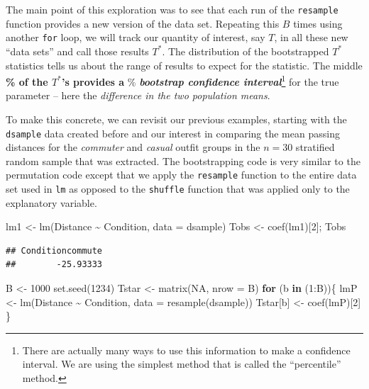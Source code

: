 \documentclass[
]{book}
\newenvironment{Shaded}{\begin{snugshade}}{\end{snugshade}}
\newcommand{\AttributeTok}[1]{\textcolor[rgb]{0.77,0.63,0.00}{#1}}
\newcommand{\ConstantTok}[1]{\textcolor[rgb]{0.00,0.00,0.00}{#1}}
\newcommand{\ControlFlowTok}[1]{\textcolor[rgb]{0.13,0.29,0.53}{\textbf{#1}}}
\newcommand{\DecValTok}[1]{\textcolor[rgb]{0.00,0.00,0.81}{#1}}
\newcommand{\FunctionTok}[1]{\textcolor[rgb]{0.00,0.00,0.00}{#1}}
\newcommand{\NormalTok}[1]{#1}
\newcommand{\OtherTok}[1]{\textcolor[rgb]{0.56,0.35,0.01}{#1}}
\newcommand{\SpecialCharTok}[1]{\textcolor[rgb]{0.00,0.00,0.00}{#1}}
\begin{document}
\indent The main point of this exploration was to see that each run of the
\texttt{resample} function provides a new version of the data set. Repeating this
\(B\) times using
another \texttt{for} loop, we will track our quantity of interest, say \(T\), in all
these new ``data sets'' and call those results \(T^*\). The distribution of the
bootstrapped
\(T^*\) statistics tells us about the range of results to expect
for the statistic. The middle \textbf{\% of the \(T^*\)'s provides a }\%
\textbf{\emph{bootstrap confidence interval}}\footnote{There are actually many ways to use this
  information to make a confidence interval. We are using the simplest method
  that is called the ``percentile'' method.} for the true parameter -- here the \emph{difference in the two population means}.

\indent To make this concrete, we can revisit our previous examples, starting
with the \texttt{dsample} data created before and our interest in comparing the
mean passing distances for the \emph{commuter} and \emph{casual} outfit groups in the \(n = 30\) stratified random sample that was extracted. The
bootstrapping code is very similar to the permutation code except that we apply
the \texttt{resample} function to the entire data set used in \texttt{lm} as opposed to the \texttt{shuffle}
function that was applied only to the explanatory variable.

\begin{Shaded}
\begin{Highlighting}[]
\NormalTok{lm1 }\OtherTok{\textless{}{-}} \FunctionTok{lm}\NormalTok{(Distance }\SpecialCharTok{\textasciitilde{}}\NormalTok{ Condition, }\AttributeTok{data =}\NormalTok{ dsample)}
\NormalTok{Tobs }\OtherTok{\textless{}{-}} \FunctionTok{coef}\NormalTok{(lm1)[}\DecValTok{2}\NormalTok{]; Tobs}
\end{Highlighting}
\end{Shaded}

\begin{verbatim}
## Conditioncommute 
##        -25.93333
\end{verbatim}

\begin{Shaded}
\begin{Highlighting}[]
\NormalTok{B }\OtherTok{\textless{}{-}} \DecValTok{1000}
\FunctionTok{set.seed}\NormalTok{(}\DecValTok{1234}\NormalTok{)}
\NormalTok{Tstar }\OtherTok{\textless{}{-}} \FunctionTok{matrix}\NormalTok{(}\ConstantTok{NA}\NormalTok{, }\AttributeTok{nrow =}\NormalTok{ B)}
\ControlFlowTok{for}\NormalTok{ (b }\ControlFlowTok{in}\NormalTok{ (}\DecValTok{1}\SpecialCharTok{:}\NormalTok{B))\{}
\NormalTok{  lmP }\OtherTok{\textless{}{-}} \FunctionTok{lm}\NormalTok{(Distance }\SpecialCharTok{\textasciitilde{}}\NormalTok{ Condition, }\AttributeTok{data =} \FunctionTok{resample}\NormalTok{(dsample))}
\NormalTok{  Tstar[b] }\OtherTok{\textless{}{-}} \FunctionTok{coef}\NormalTok{(lmP)[}\DecValTok{2}\NormalTok{]}
\NormalTok{\}}
\end{Highlighting}
\end{Shaded}
\end{document}
